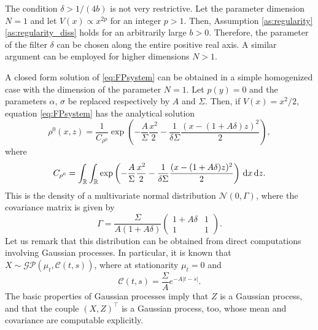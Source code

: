 \documentclass[10pt]{article}
\begin{document}
\begin{remark} The condition $\delta > 1 / (4b)$ is not very restrictive. Let the parameter dimension $N = 1$ and let $V(x) \propto x^{2p}$ for an integer $p > 1$. Then, Assumption \ref{as:regularity}\ref{as:regularity_diss} holds for an arbitrarily large $b > 0$. Therefore, the parameter of the filter $\delta$ can be chosen along the entire positive real axis. A similar argument can be employed for higher dimensions $N > 1$.
\end{remark}

\begin{example}\label{ex:OrnUhl} A closed form solution of \eqref{eq:FPsystem} can be obtained in a simple homogenized case with the dimension of the parameter $N=1$. Let $p(y) = 0$ and the parameters $\alpha$, $\sigma$ be replaced respectively by $A$ and $\Sigma$. Then, if $V(x) = x^2/2$, equation \eqref{eq:FPsystem} has the analytical solution 
\begin{equation}
\rho^0(x,z) = \frac{1}{C_{\rho^0}} \exp\left(-\frac{A}{\Sigma} \frac{x^2}{2} - \frac{1}{\delta \Sigma} \frac{(x - (1+A \delta)z)^2}{2}\right),
\end{equation}
where
\begin{equation}
C_{\rho^0} = \int_{\mathbb{R}} \int_{\mathbb{R}} \exp\left(-\frac{A}{\Sigma} \frac{x^2}{2} - \frac{1}{\delta \Sigma} \frac{(x - (1+A \delta)z)^2}{2}\right) \,\mathrm{d} x \,\mathrm{d} z.
\end{equation}
This is the density of a multivariate normal distribution $\mathcal N(0, \Gamma)$, where the covariance matrix is given by
\begin{equation}
\Gamma = \frac{\Sigma}{A (1 + A\delta)} \begin{pmatrix} 1+A\delta & 1 \\ 1 & 1 \end{pmatrix}.
\end{equation}
Let us remark that this distribution can be obtained from direct computations involving Gaussian processes. In particular, it is known that $X \sim \mathcal{GP}(\mu_t, \mathcal C(t, s))$, where at stationarity $\mu_t = 0$ and
\begin{equation}
	\mathcal C(t, s) = \frac{\Sigma}{A} e^{-A|t-s|}.
\end{equation}
The basic properties of Gaussian processes imply that $Z$ is a Gaussian process, and that the couple $(X, Z)^\top$ is a Gaussian process, too, whose mean and covariance are computable explicitly.
\end{example}
\end{document}

